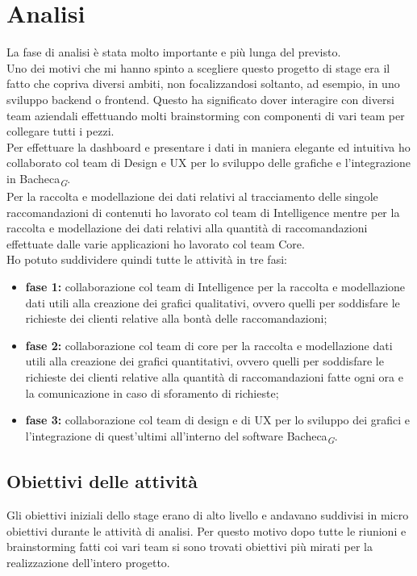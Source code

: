 \documentclass[a4paper, 12pt, twoside, openright]{book}
\newcommand{\gloss}[1]{#1\textsubscript{\textit{\tiny{G}}}}
\begin{document}
\newpage{}
\section{Analisi}
\label{analisi}
La fase di analisi è stata molto importante e più lunga del previsto.\\
Uno dei motivi che mi hanno spinto a scegliere questo progetto di stage era il fatto che copriva diversi ambiti, non focalizzandosi soltanto, ad esempio, in uno sviluppo backend o frontend. Questo ha significato dover interagire con diversi team aziendali effettuando molti brainstorming con componenti di vari team per collegare tutti i pezzi.\\

Per effettuare la dashboard e presentare i dati in maniera elegante ed intuitiva ho collaborato col team di Design e UX per lo sviluppo delle grafiche e l'integrazione in \gloss{Bacheca}.\\Per la raccolta e modellazione  dei dati relativi al tracciamento delle singole raccomandazioni di contenuti ho lavorato col team di Intelligence mentre per la raccolta e modellazione dei dati relativi alla quantità di raccomandazioni effettuate dalle varie applicazioni ho lavorato col team Core.\\
Ho potuto suddividere quindi tutte le attività in tre fasi:
\begin{itemize}
\item \textbf{fase 1:} collaborazione col team di Intelligence per la raccolta e modellazione dati utili alla creazione dei grafici qualitativi, ovvero quelli per soddisfare le richieste dei clienti relative alla bontà delle raccomandazioni;
\item \textbf{fase 2:} collaborazione col team di core per la raccolta e modellazione dati utili alla creazione dei grafici quantitativi, ovvero quelli per soddisfare le richieste dei clienti relative alla quantità di raccomandazioni fatte ogni ora e la comunicazione in caso di sforamento di richieste;
\item \textbf{fase 3:} collaborazione col team di design e di UX per lo sviluppo dei grafici e l'integrazione di quest'ultimi all'interno del software \gloss{Bacheca}.
\end{itemize}

\newpage{}
\subsection{Obiettivi delle attività}
Gli obiettivi iniziali dello stage erano di alto livello e andavano suddivisi in micro obiettivi durante le attività di analisi. Per questo motivo dopo tutte le riunioni e brainstorming fatti coi vari team si sono trovati obiettivi più mirati per la realizzazione dell'intero progetto.\\
\end{document}
